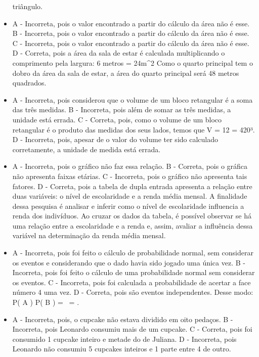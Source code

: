 \begin{itemize}
triângulo.
\item A - Incorreta, pois o valor encontrado a partir do cálculo da área não é
esse.
B - Incorreta, pois o valor encontrado a partir do cálculo da área não é
esse.
C - Incorreta, pois o valor encontrado a partir do cálculo da área não é
esse.
D - Correta, pois a área da sala de estar é calculada multiplicando o
comprimento pela largura:
{6 \; metros}  = 24\;m^2 Como o quarto principal
tem o dobro da área da sala de estar, a área do quarto principal será 48
metros quadrados.
\item A - Incorreta, pois considerou que o volume de um bloco retangular é a
soma das três medidas.
B - Incorreta, pois além de somar as três medidas, a unidade está
errada.
C - Correta, pois, como o volume de um bloco retangular é o produto das
medidas dos seus lados, temos que
V = 12   = 420³.
D - Incorreta, pois, apesar de o valor do volume ter sido calculado
corretamente, a unidade de medida está errada.
\item A - Incorreta, pois o gráfico não faz essa relação.
B - Correta, pois o gráfica não apresenta faixas etárias.
C - Incorreta, pois o gráfico não apresenta tais fatores.
D - Correta, pois a tabela de dupla entrada apresenta a relação entre
duas variáveis: o nível de escolaridade e a renda média mensal. A
finalidade dessa pesquisa é analisar e inferir como o nível de
escolaridade influencia a renda dos indivíduos. Ao cruzar os dados da
tabela, é possível observar se há uma relação entre a escolaridade e a
renda e, assim, avaliar a influência dessa variável na determinação da
renda média mensal.
\item A - Incorreta, pois foi feito o cálculo de probabilidade normal, sem
considerar os eventos e considerando que o dado havia sido jogado uma
única vez.
B - Incorreta, pois foi feito o cálculo de uma probabilidade normal sem
considerar os eventos.
C - Incorreta, pois foi calculada a probabilidade de acertar a face
número 4 uma vez.
D - Correta, pois são eventos independentes. Desse modo:
P\left( A \right) \times P\left( B \right) =  \times {}\  = .
\item A - Incorreta, pois, o cupcake não estava dividido em oito pedaços.
B - Incorreta, pois Leonardo consumiu mais de um cupcake.
C - Correta, pois foi consumido 1 cupcake inteiro e metade do de
Juliana.
D - Incorreta, pois Leonardo não consumiu 5 cupcakes inteiros e 1 parte
entre 4 de outro.
\end{itemize}

